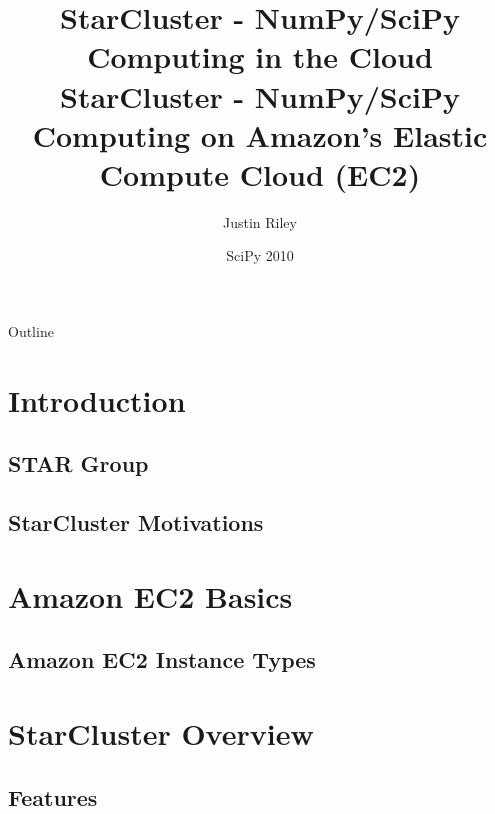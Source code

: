 \documentclass[english,compress]{beamer}
\title[StarCluster] 
{%
  StarCluster - NumPy/SciPy Computing in the Cloud%
}
\title{StarCluster - NumPy/SciPy Computing on Amazon's Elastic Compute Cloud (EC2)}
\author{Justin Riley}
\institute[Massachusetts Institute of Technology] %
{
  Software Tools for Academics and Researchers\\
  Office of Educational Innovation and Technology\\
  Massachusetts Institute of Technology}
\date[SciPy 2010]{SciPy 2010}
\begin{document}

\frame{\titlepage}

\section[Outline]{}
\begin{frame}{Outline}
  \tableofcontents
\end{frame}

\section{Introduction}
\subsection{STAR Group}

\subsection{StarCluster Motivations}



\section{Amazon EC2 Basics}
\subsection{Amazon EC2 Instance Types}


\questionframe{}

\section{StarCluster Overview}
\subsection{Features}





\end{document}
